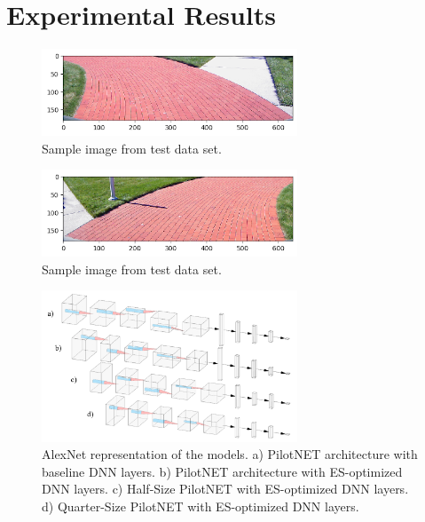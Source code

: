 \documentclass[conference]{IEEEtran}
\begin{document}
\section{Experimental Results}

\begin{figure}[ht]
    \centering
    \includegraphics[width=3in]{assets/leftturn.png}
    \caption{ Sample image from test data set. }
    \label{fig:leftturn}
\end{figure}

\begin{figure}[ht]
    \centering
    \includegraphics[width=3in]{assets/rightturn.png}
    \caption{ Sample image from test data set. }
    \label{fig:rightturn}
\end{figure}

\begin{figure}[ht]
    \centering
    \includegraphics[width=3in]{assets/alexnet.png}
    \caption{ AlexNet representation of the models. a) PilotNET architecture with baseline DNN layers. b) PilotNET architecture with ES-optimized DNN layers. c) Half-Size PilotNET with ES-optimized DNN layers. d) Quarter-Size PilotNET with ES-optimized DNN layers. }
    \label{fig:alexnet}
\end{figure}
\end{document}
